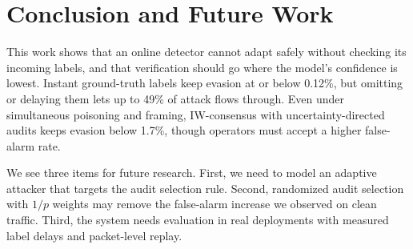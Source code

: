 \documentclass[conference]{IEEEtran}
\begin{document}
\section{Conclusion and Future Work}\label{sec:conclusion}

This work shows that an online detector cannot adapt safely without checking
its incoming labels, and that verification should go where the model's
confidence is lowest. Instant ground-truth labels keep evasion at or below
0.12\%, but omitting or delaying them lets up to 49\% of attack flows through.
Even under simultaneous poisoning and framing, IW-consensus with
uncertainty-directed audits keeps evasion below 1.7\%, though operators must
accept a higher false-alarm rate.

We see three items for future research. First, we need to model an adaptive
attacker that targets the audit selection rule. Second, randomized audit
selection with $1/p$ weights may remove the false-alarm increase we observed
on clean traffic. Third, the system needs evaluation in real deployments with
measured label delays and packet-level replay.



\end{document}
